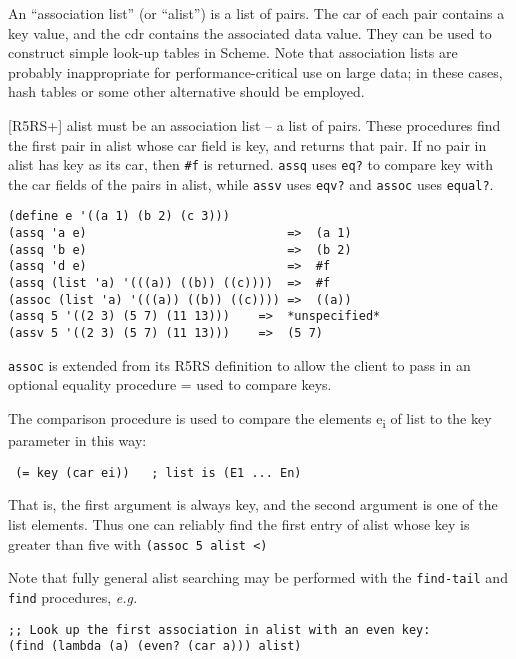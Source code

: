 An ``association list'' (or ``alist'') is a list of pairs. The car of
each pair contains a key value, and the cdr contains the associated data
value. They can be used to construct simple look-up tables in Scheme.
Note that association lists are probably inappropriate for
performance-critical use on large data; in these cases, hash tables or
some other alternative should be employed.

\begin{entry}{%
  }

  {[}R5RS+{]}
  alist must be an association list -- a list of pairs. These
  procedures find the first pair in alist whose car field is key, and
  returns that pair. If no pair in alist has key as its car, then
  \texttt{\#f} is returned. \texttt{assq} uses \texttt{eq?}  to
  compare key with the car fields of the pairs in alist, while
  \texttt{assv} uses \texttt{eqv?} and \texttt{assoc} uses
  \texttt{equal?}.

\begin{verbatim}
(define e '((a 1) (b 2) (c 3)))
(assq 'a e)                            =>  (a 1)
(assq 'b e)                            =>  (b 2)
(assq 'd e)                            =>  #f
(assq (list 'a) '(((a)) ((b)) ((c))))  =>  #f
(assoc (list 'a) '(((a)) ((b)) ((c)))) =>  ((a))
(assq 5 '((2 3) (5 7) (11 13)))    =>  *unspecified*
(assv 5 '((2 3) (5 7) (11 13)))    =>  (5 7)
\end{verbatim}

  \texttt{assoc} is extended from its R5RS definition to allow the
  client to pass in an optional equality procedure = used to compare
  keys.

  The comparison procedure is used to compare the elements
  e\textsubscript{i} of list to the key parameter in this way:

  \texttt{\ (=\ key\ (car\ ei))\ \ \ ;\ list\ is\ (E1\ ...\ En)}

  That is, the first argument is always key, and the second argument
  is one of the list elements. Thus one can reliably find the first
  entry of alist whose key is greater than five with \texttt{(assoc\
    5\ alist\ \textless{})}

  Note that fully general alist searching may be performed with the
  \texttt{find-tail} and \texttt{find} procedures, \emph{e.g.}

\begin{verbatim}
;; Look up the first association in alist with an even key:
(find (lambda (a) (even? (car a))) alist)
\end{verbatim}
\end{entry}

